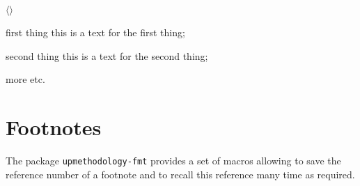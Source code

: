 \documentclass[book,taskpackage,specpackage,codepackage]{upmethodology-document}
\begin{document}
\begin{enumdescriptionx}[a]{$\langle$}{$\rangle$}
\item[first thing] this is a text for the first thing;
\item[second thing] this is a text for the second thing;
\item[more] etc.
\end{enumdescriptionx}


\section{Footnotes}

The package \texttt{upmethodology-fmt} provides a set of macros allowing to save the reference number of a footnote and to recall this reference many time as required.
\end{document}
